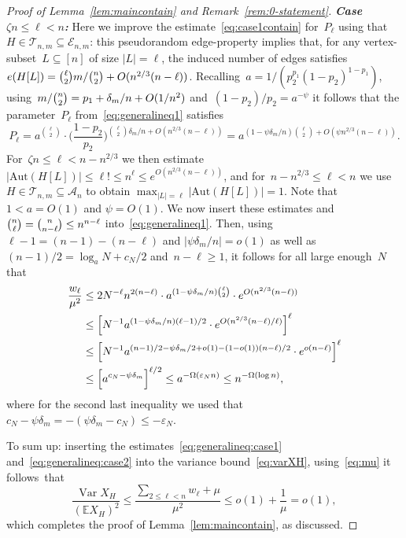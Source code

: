 \documentclass{article}
\newcommand{\eps}{\varepsilon}
\newcommand{\E}{\mathbb{E}}
\newcommand{\cA}{\mathcal{A}}
\newcommand{\cE}{\mathcal{E}}
\newcommand{\cT}{\mathcal{T}}
\DeclareMathOperator{\var}{Var}
\newcommand{\epsp}{\zeta} \newcommand{\polylog}{\mathrm{polylog}}
\newcommand\abs[1]{\left|#1\right|}
\newcommand{\Aut}{\mathrm{Aut}}
\newcommand{\w}{w}
\newcommand\biggpar[1]{\biggl(#1\biggr)}
\newcommand\Bigsqpar[1]{\Bigl[#1\Bigr]}
\newcommand\lrsqpar[1]{\left[#1\right]}
\newcommand{\refL}[1]{Lemma~\ref{#1}}
\begin{document}
\begin{proof}[Proof of \refL{lem:maincontain} and Remark~\ref{rem:0-statement}]
\textit{\bf Case~$\epsp n \le \ell < n$:} 
Here we improve the estimate~\eqref{eq:case1contain} for~$P_\ell$ using that~$H \in {\cT_{n,m} \subseteq \cE_{n,m}}$: this pseudorandom edge-property implies that, for any vertex-subset~$L\subseteq [n]$ of size  $|L|=\ell$, the induced number of edges satisfies~$e(H[L])=\tbinom{\ell}{2}m/\tbinom{n}{2} +  O(n^{2/3}(n-\ell))$.
Recalling~$a = {1/(p_2^{p_1}(1-p_2)^{1-p_1})}$, using~$m/\tbinom{n}{2}=p_1+\delta_m/n+O(1/n^2)$ and~$(1-p_2)/p_2 = a^{-\psi}$ it follows that the parameter~$P_\ell$ from~\eqref{eq:generalineq1} satisfies 
\begin{equation}\label{eq:case2contain}
	P_{\ell}
	= a^{\binom{\ell}{2}} \cdot \biggpar{\frac{1-p_2}{p_2}}^{\binom{\ell}{2} \delta_m/n + O(n^{2/3}(n-\ell))}
	=a^{(1-\psi \delta_m/n)\binom{\ell}{2} + O(\psi n^{2/3}(n-\ell))} .
\end{equation}
For~$\epsp n \le \ell < n - n^{2/3}$ we then estimate~$|\Aut(H[L])| \leq \ell! \le n^{\ell} \le e^{O(n^{2/3}(n-\ell))}$, and for~$n - n^{2/3} \le \ell < n$ we use~${H \in \cT_{n,m} \subseteq \cA_{n}}$ to obtain $\max_{|L|=\ell} |\Aut(H[L])|=1$.
Note that~$1 < a= O(1)$ and $\psi=O(1)$.
We now insert these estimates and~${\tbinom{n}{\ell}=\tbinom{n}{n-\ell} \le n^{n-\ell}}$ into~\eqref{eq:generalineq1}. 
Then, using $\ell-1 = (n-1) - (n-\ell)$ and  $\abs{\psi\delta_m/n} = o(1)$ as well as $(n-1)/2 = \log_a N + c_N/2$ and~$n-\ell \ge 1$, it follows for all large enough~$N$ that 
\begin{equation}\label{eq:generalineq:case2}
\begin{split}
	\frac{\w_\ell}{\mu^2}&\le 2N^{-\ell}n^{2(n-\ell)} \cdot a^{(1-\psi \delta_m/n)\binom{\ell}{2}} \cdot e^{O( n^{2/3}(n-\ell))} \\
	&\leq\lrsqpar{N^{-1}a^{(1-\psi \delta_m/n)(\ell-1)/2} \cdot e^{O(n^{2/3}(n-\ell)/\ell)}}^\ell\\
	&\leq\lrsqpar{N^{-1}a^{(n-1)/2 - \psi\delta_m/2 +o(1)  - (1-o(1))(n-\ell)/2} \cdot e^{o(n-\ell)}}^\ell\\
	& \le \Bigsqpar{a^{c_N -\psi\delta_m}}^{\ell/2} \le a^{-\Omega(\eps_N n)} \le n^{-\Omega(\log n)},
\end{split}
\end{equation}
where for the second last inequality we used that~$c_N-\psi\delta_m=-(\psi\delta_m-c_N)\leq-\eps_N$. 

To sum up: inserting the estimates~\eqref{eq:generalineq:case1} and~\eqref{eq:generalineq:case2} into the variance bound~\eqref{eq:varXH}, using~\eqref{eq:mu} it follows~that 
 \[   \frac{\var X_H }{(\E X_H)^2} \le  \frac{\sum_{2 \le \ell < n}\w_\ell+\mu}{\mu^2} \le o(1) + \frac{1}{\mu} =o(1),\]
 which completes the proof of \refL{lem:maincontain}, as discussed.
\end{proof}
\end{document}
